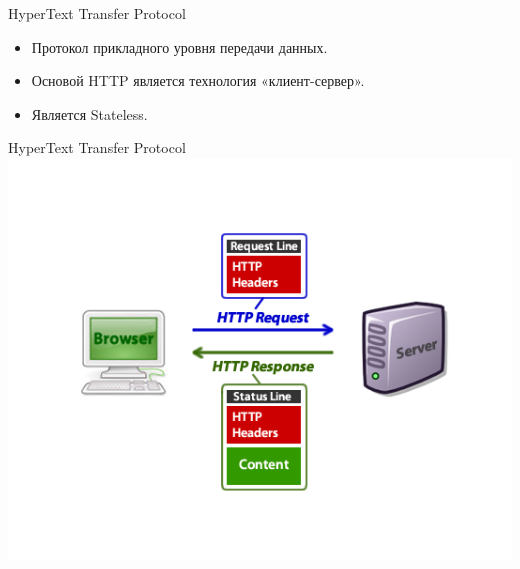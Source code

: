 \begin{frame}{HyperText Transfer Protocol}
 \begin{center}
 \begin{itemize}
 \item Протокол прикладного уровня передачи данных.
 \item Основой HTTP является технология «клиент-сервер».
 \item Является Stateless.
 \end{itemize}
 \end{center}
\end{frame}
\begin{frame}{HyperText Transfer Protocol}
  \includegraphics[width=\textwidth>]{sources/images/http_diagram.png}
\end{frame}